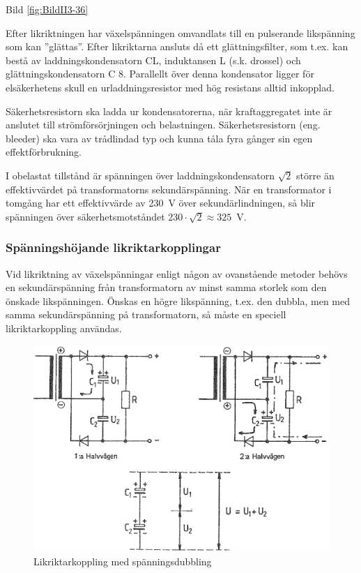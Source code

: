 Bild \ref{fig:BildII3-36}

Efter likriktningen har växelspänningen omvandlats till en pulserande
likspänning som kan ''glättas''. Efter likriktarna ansluts då ett
glättningsfilter, som t.ex. kan bestå av laddningskondensatorn CL,
induktansen L (s.k. drossel) och glättningskondensatorn C 8.
Parallellt över denna kondensator ligger för elsäkerhetens skull en
urladdningsresistor med hög resistans alltid inkopplad.

Säkerhetsresistorn ska ladda ur kondensatorerna, när kraftaggregatet
inte är anslutet till strömförsörjningen och
belastningen. Säkerhetsresistorn (eng. bleeder) ska vara av
trådlindad typ och kunna tåla fyra gånger sin egen effektförbrukning.

I obelastat tillstånd är spänningen över laddningskondensatorn
\(\sqrt{2}\) större än effektivvärdet på transformatorns
sekundärspänning. När en transformator i tomgång har ett effektivvärde
av 230~V över sekundärlindningen, så blir spänningen över
säkerhetsmotståndet \(230\cdot\sqrt{2} \approx 325\)~V.

\subsubsection{Spänningshöjande likriktarkopplingar}

Vid likriktning av växelspänningar enligt någon av ovanstående metoder
behövs en sekundärspänning från transformatorn av minst samma storlek
som den önskade likspänningen. Önskas en högre likspänning, t.ex. den
dubbla, men med samma sekundärspänning på transformatorn, så måste en
speciell likriktarkoppling användas.

\begin{figure}
\includegraphics[width=\textwidth]{images/cropped_pdfs/bild_2_3-37.pdf}
\caption{Likriktarkoppling med spänningsdubbling}
\label{fig:BildII3-37}
\end{figure}

